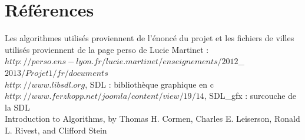 \documentclass[a4paper,11pt]{article}
\begin{document}
\section{Références}

Les algorithmes utilisés proviennent de l'énoncé du projet et les fichiers de villes utilisés proviennent de la page perso de Lucie Martinet : \\
$http://perso.ens-lyon.fr/lucie.martinet/enseignements/2012$\_$2013/Projet1/fr/documents$\\
{\label{SDL}
$http://www.libsdl.org$, SDL : bibliothèque graphique en c}\\
{\label{SDLgfx}
$http://www.ferzkopp.net/joomla/content/view/19/14$, SDL\_gfx : surcouche de la SDL\\
Introduction to Algorithms, by Thomas H. Cormen, Charles E. Leiserson, Ronald L. Rivest, and Clifford Stein}
\end{document}
